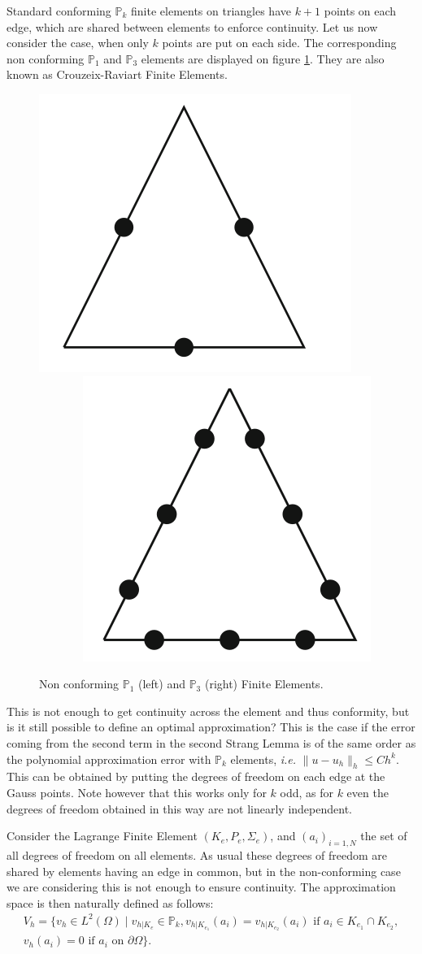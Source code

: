 Standard conforming $\mathbb{P}_k$ finite elements on triangles have $k+1$ points on each
edge, which are shared between elements to enforce continuity. 
Let us now consider the case, when only $k$ points are put on each side. 
The corresponding non conforming $ \mathbb{P}_1$ and $ \mathbb{P}_3$ elements are displayed on figure \ref{fig:non_conf}. They are also known as Crouzeix-Raviart Finite Elements.
\begin{figure}[htbp]
\centerline{
\includegraphics[width=.3\textwidth]{figures/part_4/P1_non_conf} ~~~~~~~
\includegraphics[width=.3\textwidth]{figures/part_4/P3_non_conf} 
}
\caption{\label{fig:non_conf} Non conforming $ \mathbb{P}_1$ (left) and $ \mathbb{P}_3$ (right) Finite Elements. }
\end{figure}
This is not enough to get continuity across the element and thus conformity, but is it still possible to define an optimal approximation? This is the case if the error coming from the second term in the second Strang Lemma is of the same order as the polynomial approximation error with $ \mathbb{P}_k$ elements, \textit{i.e.} \mbox{$\|u-u_h\|_h\leq C h^{k}$}. This can be obtained by putting the degrees of freedom on each edge at the Gauss points. Note however that this works only for $k$ odd, as for $k$ even the degrees of freedom obtained in this way are not linearly independent.

Consider the Lagrange Finite Element $(K_e,P_e,\Sigma_e)$, and $(a_i)_{i=1,N}$ the set of all degrees of freedom on all elements. As usual these degrees of freedom are shared by elements having an edge in common, but in the non-conforming case we are considering this is not enough to ensure continuity. The approximation space is then naturally defined as follows:
\begin{multline*}
V_h=\{ v_h\in L^2(\Omega) \;|\; v_{h|K_e}\in \mathbb{P}_k, v_{h|K_{e_1}}(a_i) =   v_{h|K_{e_2}}(a_i) \mbox{ if }a_i\in K_{e_1}\cap K_{e_2}, \\
v_h(a_i)=0  \mbox{ if } a_i \mbox{ on }\partial\Omega\}.
\end{multline*}

